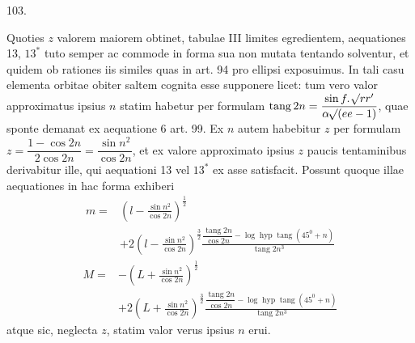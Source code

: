 \par{}\medskip
\hypertarget{native-142-article103}{}
\begin{center}103.\end{center}
Quoties $z$ valorem maiorem obtinet, tabulae III limites egredientem, aequationes 13, $13^*$ tuto semper ac commode in forma sua non mutata tentando solventur, et quidem ob rationes iis similes quas in art. 94 pro ellipsi exposuimus. In tali casu elementa orbitae obiter saltem cognita esse supponere licet: tum vero valor approximatus ipsius $n$ statim habetur per formulam $\operatorname{tang}2n=\dfrac{\sin f\mathpunct{.}\mathord{{}^{}\!\surd}rr'}{\alpha\mathord{{}^{}\!\surd}(ee-1)}$, quae sponte demanat ex aequatione 6 art. 99. Ex $n$ autem habebitur $z$ per formulam $z=\dfrac{1-\cos2n}{2\cos2n}=\dfrac{\sin n^2}{\cos2n}$, et ex valore approximato ipsius $z$ paucis tentaminibus derivabitur ille, qui aequationi 13 vel $13^*$ ex asse satisfacit. Possunt quoque illae aequationes in hac forma exhiberi
\[
\begin{aligned}
m={}&\left(l-\frac{\sin n^2}{\cos2n}\right)^{\frac12}\\[.6em]
&+2\left(l-\frac{\sin n^2}{\cos2n}\right)^{\frac32}\frac{\dfrac{\operatorname{tang}2n}{\cos2n}-\log\operatorname{hyp}\operatorname{tang}(45^0+n)}{\operatorname{tang}2n^3}
\end{aligned}
\]
\[
\begin{aligned}
M={}&-\left(L+\frac{\sin n^2}{\cos2n}\right)^{\frac12}\\[.6em]
&+2\left(L+\frac{\sin n^2}{\cos2n}\right)^{\frac32}\frac{\dfrac{\operatorname{tang}2n}{\cos2n}-\log\operatorname{hyp}\operatorname{tang}(45^0+n)}{\operatorname{tang}2n^3}
\end{aligned}
\]
\noindent atque sic, neglecta $z$, statim valor verus ipsius $n$ erui.
